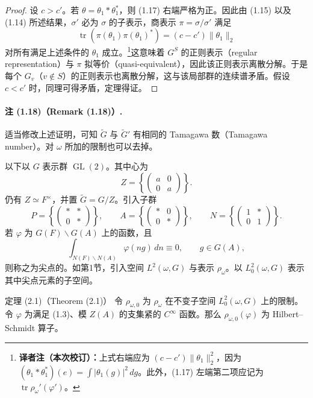 \begin{proof}
设 $c>c'$。若 $\theta=\theta_1*\theta_1^*$，则 (1.17) 右端严格为正。因此由 (1.15) 以及
(1.14) 所述结果，$\sigma'$ 必为 $\sigma$ 的子表示，商表示 $\pi=\sigma/\sigma'$ 满足
\[
 \operatorname{tr}(\pi(\theta_1)\pi(\theta_1)^*)=(c-c')\|\theta_1\|_2
\]
对所有满足上述条件的 $\theta_1$ 成立。\footnote{\textbf{译者注（本次校订）：}上式右端应为 $(c-c')\|\theta_1\|_2^2$，因为 $(\theta_1*\theta_1^*)(e)=\int|\theta_1(g)|^2\,dg$。此外，(1.17) 左端第二项应记为 $\operatorname{tr}\rho_\omega'(\varphi')$。}这意味着 $G^S$ 的正则表示（regular representation）与 $\pi$ 拟等价（quasi-equivalent），因此该正则表示离散分解。于是每个
$G_v$（$v\notin S$）的正则表示也离散分解，这与该局部群的连续谱矛盾。假设 $c<c'$ 时，同理可得矛盾，定理得证。
\end{proof}

\paragraph*{注 (1.18)（Remark (1.18)）.}
适当修改上述证明，可知 $\widetilde G$ 与 $\widetilde G'$ 有相同的 Tamagawa 数（Tamagawa number）。对 $\omega$ 所加的限制也可以去掉。

以下以 $G$ 表示群 $\operatorname{GL}(2)$。其中心为
\[
 Z=\left\{\begin{pmatrix}a&0\\0&a\end{pmatrix}\right\}.
\]
仍有 $Z\simeq F^\times$，并置 $\widetilde G=G/Z$。引入子群
\[
 P=\left\{\begin{pmatrix}*&*\\0&*\end{pmatrix}\right\},\qquad
 A=\left\{\begin{pmatrix}*&0\\0&*\end{pmatrix}\right\},\qquad
 N=\left\{\begin{pmatrix}1&*\\0&1\end{pmatrix}\right\}.
\]
若 $\varphi$ 为 $G(F)\backslash G(A)$ 上的函数，且
\[
 \int_{N(F)\backslash N(A)}\varphi(ng)\,dn\equiv0,\qquad g\in G(A),
\]
则称之为尖点的。如第1节，引入空间 $L^2(\omega,G)$ 与表示 $\rho_\omega$。以
$L_0^2(\omega,G)$ 表示其中尖点元素的子空间。

\begin{originaltheorem}{定理 (2.1)（Theorem (2.1)）}
令 $\rho_{\omega,0}$ 为 $\rho_\omega$ 在不变子空间 $L_0^2(\omega,G)$ 上的限制。令 $\varphi$ 为满足 (1.3)、模 $Z(A)$ 的支集紧的 $C^\infty$ 函数。那么
$\rho_{\omega,0}(\varphi)$ 为 Hilbert--Schmidt 算子。
\end{originaltheorem}
